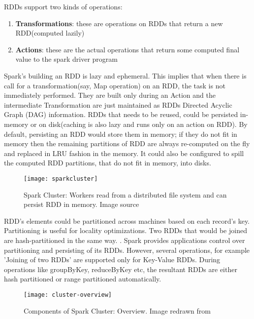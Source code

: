 \documentclass[article,type=msc,colorback,12pt,accentcolor=tud1d]{tudthesis}
\begin{document}
		   RDDs support two kinds of operations:
		   
		   \begin{enumerate}
		   	\item \textbf{Transformations}: these are operations on RDDs that return a new RDD(computed lazily)
		    \item \textbf{Actions}: these are the actual operations that return some computed final value to the spark driver program \cite{sparkbook}
		   \end{enumerate}
		   
		   Spark's building an RDD is lazy and ephemeral. This implies that when there is call for a transformation(say, Map operation) on an RDD, the task is not immediately performed. They are built only during an Action and the intermediate Transformation are just maintained as RDDs Directed Acyclic Graph (DAG) information. RDDs that needs to be reused, could be persisted in-memory or on disk(caching is also lazy and runs only on an action on RDD). By default, persisting an RDD would store them in memory; if they do not fit in memory then the remaining partitions of RDD are always re-computed on the fly and replaced in LRU fashion in the memory. It could also be configured to spill the computed RDD partitions, that do not fit in memory, into disks. 
		   
		   \begin{figure}[p]
			   	\centering
			   	\texttt{[image: sparkcluster]}
			   	\caption{Spark Cluster: Workers read from a distributed file system and can persist RDD in memory. Image source \cite{RDDmainpaper}  }
			   	\label{fig:sparkcluster}
		   \end{figure}
		   	   
		   RDD's elements could be partitioned across machines based on each record's key. Partitioning is useful for locality optimizations. Two RDDs that would be joined are hash-partitioned in the same way. \cite{RDDmainpaper}. Spark provides applications control over partitioning and persisting of its RDDs. However, several operations, for example 'Joining of two RDDs' are supported only for Key-Value RDDs.  During operations like groupByKey, reduceByKey etc, the resultant RDDs are either hash partitioned or range partitioned automatically.
		   		   
		     \begin{figure}[p]
		     	\centering
		     	\texttt{[image: cluster-overview]}
		     	\caption{Components of Spark Cluster: Overview. Image redrawn from  \cite{sparkcluster}  }
		     	\label{fig:sparkcluster}
		     \end{figure}
		   
\end{document}
